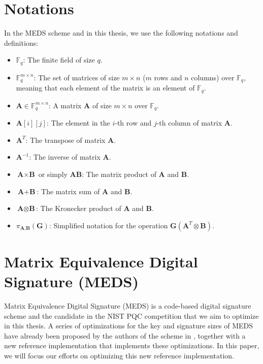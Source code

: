 \documentclass[11pt,a4paper]{report}
\theoremstyle{definition}
\begin{document}
\section{Notations}
\label{sec:notations}
In the MEDS scheme and in this thesis, we use the following notations and definitions:
\begin{itemize}
  \item $\mathbb{F}_q$: The finite field of size $q$.
  \item $\mathbb{F}_q^{m \times n}$: The set of matrices of size $m \times n$ ($m$ rows and $n$ columns) over $\mathbb{F}_q$, meaning that each element of the matrix is an element of $\mathbb{F}_q$.
  \item $\textbf{A} \in \mathbb{F}_q^{m \times n}$: A matrix $\textbf{A}$ of size $m \times n$ over $\mathbb{F}_q$.
  \item $\textbf{A}[i][j]$: The element in the $i$-th row and $j$-th column of matrix $\textbf{A}$.
  \item $\textbf{A}^T$: The transpose of matrix $\textbf{A}$.
  \item $\textbf{A}^{-1}$: The inverse of matrix $\textbf{A}$.
  \item $\textbf{A} \times \textbf{B}$ or simply $\textbf{AB}$: The matrix product of $\textbf{A}$ and $\textbf{B}$.
  \item $\textbf{A} + \textbf{B}$: The matrix sum of $\textbf{A}$ and $\textbf{B}$.
  \item $\textbf{A} \otimes \textbf{B}$: The Kronecker product of $\textbf{A}$ and $\textbf{B}$.
  \item $\pi_{\textbf{A}, \textbf{B}}(\textbf{G})$: Simplified notation for the operation $\textbf{G}(\textbf{A}^T \otimes \textbf{B})$.
\end{itemize}

\section{Matrix Equivalence Digital Signature (MEDS)}
\label{sec:meds}
Matrix Equivalence Digital Signature (MEDS) \cite{chou2023take} is a code-based digital signature scheme and the candidate in the NIST PQC competition that we aim to optimize in this thesis. A series of optimizations for the key and signature sizes of MEDS have already been proposed by the authors of the scheme in \cite{chou2024reducing}, together with a new reference implementation that implements these optimizations. In this paper, we will focus our efforts on optimizing this new reference implementation.
\end{document}
